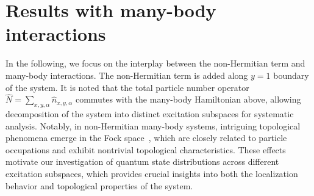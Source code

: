 \documentclass[longbibliography, aps, prx, amsmath, amssymb, amsfonts, twocolumn,superscriptaddress, footinbib]{revtex4-1}
\begin{document}

	\section{Results with many-body interactions}



	In the following, we focus on the interplay between the non-Hermitian term and many-body interactions. The non-Hermitian term is added along $y=1$ boundary of the system. It is noted that the
	total particle number operator $\hat{N} = \sum_{x,y,\alpha} \hat{n}_{x,y,\alpha}$ commutes with the many-body Hamiltonian above, 
	allowing decomposition of the system into distinct excitation subspaces for systematic analysis. 
	Notably, in non-Hermitian many-body systems, intriguing topological phenomena emerge in the Fock space~\cite{shen2024enhanced,shimomura2024general,deng2022observing}, which are closely related to particle occupations and exhibit nontrivial topological characteristics. 
	These effects motivate our investigation of quantum state distributions across different excitation subspaces, which provides crucial insights into both the localization behavior and topological properties of the system.
\end{document}

